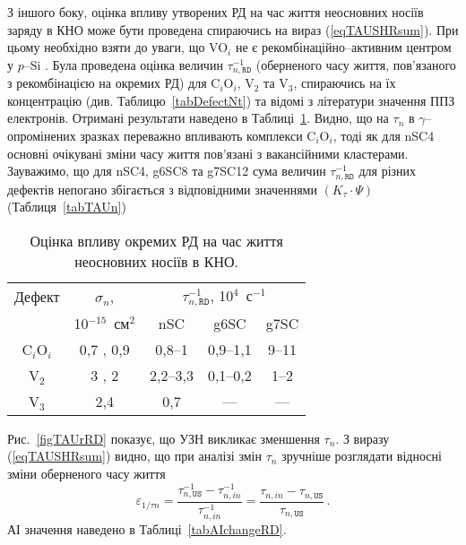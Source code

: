 З іншого боку,
оцінка впливу утворених РД на час життя неосновних носіїв заряду в КНО може бути проведена спираючись
на вираз (\ref{eqTAUSHRsum}).
При цьому необхідно взяти до уваги,
що VO$_i$ не є рекомбінаційно--активним центром у $p$--Si \cite{gamma:Kolkov,IrrCzpSi:Benton,IrrCzpSi:Coffa,IrrCzpSi:Ganagona,IrrCzpSi:Vines}.
Була проведена оцінка величин $\tau_{n,\mathtt{RD}}^{-1}$ (оберненого часу життя, пов'язаного з рекомбінацією на окремих РД)
для C$_i$O$_i$, V$_2$ та  V$_3$, спираючись на їх концентрацію (див. Таблицю~\ref{tabDefectNt}) та відомі з літератури значення ППЗ електронів.
Отримані результати наведено в Таблиці~\ref{tabDefectTAU}.
Видно, що на $\tau_n$ в $\gamma$--опромінених зразках переважно впливають комплекси C$_i$O$_i$, тоді як для nSC4 основні очікувані
зміни часу життя пов'язані з вакансійними кластерами.
Зауважимо, що для nSC4, g6SC8 та g7SC12 сума величин $\tau_{n,\mathtt{RD}}^{-1}$ для різних дефектів
непогано збігається з відповідними значеннями $(K_\tau\cdot\Psi)$ (Таблиця~\ref{tabTAUn})




\begin{table}[b]
\caption{\label{tabDefectTAU}Оцінка впливу окремих РД на час життя неосновних носіїв в КНО.
}
\center
\begin{tabular}{|c|c|c|c|c|}
\hline
Дефект&$\sigma_n$,&\multicolumn{3}{c|}{$\tau_{n,\mathtt{RD}}^{-1}$, 10$^4$~с$^{-1}$}\\ \cline{3-5}
&10$^{-15}$~см$^2$&nSC&g6SC&g7SC\\
\hline
C$_i$O$_i$&0,7 \cite{gamma:Stahl}, 0,9 \cite{gamma:Kolkr}&0,8--1&0,9--1,1&9--11\\ \hline
V$_2$&3 \cite{gamma:Stahl}, 2 \cite{A:Brothe}&2,2--3,3&0,1--0,2&1--2\\ \hline
V$_3$&2,4 \cite{V3:Markevich}&0,7&---&---\\ \hline
\end{tabular}
\end{table}

Рис.~\ref{figTAUrRD} показує, що УЗН викликає зменшення $\tau_n$.
З виразу (\ref{eqTAUSHRsum}) видно, що при аналізі змін $\tau_n$
зручніше розглядати відносні зміни оберненого часу життя
\begin{equation*}
  \varepsilon_{1/\tau n}=\frac{\tau_{n,\mathtt{US}}^{-1}-\tau_{n,in}^{-1}}{\tau_{n,in}^{-1}}=\frac{\tau_{n,in}-\tau_{n,\mathtt{US}}}{\tau_{n,\mathtt{US}}}\,.
\end{equation*}
АІ значення наведено в Таблиці~\ref{tabAIchangeRD}.

